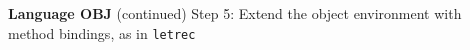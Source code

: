 \begin{minipage}[t]{\sw}
\slidenumber
\LARGE
{\bf Language OBJ} (continued)\exx
Step 5: Extend the object environment with method bindings,
as in \verb'letrec'\exx
\centerline{}
\end{minipage}
